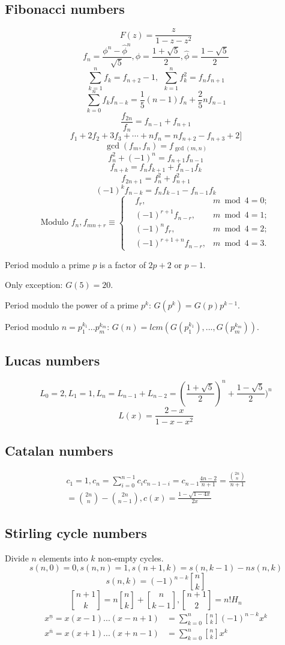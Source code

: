 	\subsection{Fibonacci numbers}
	\[ F(z) = \frac{z}{1-z-z^2} \]
	\[ f_n = \frac{{\phi}^n-{\hat{\phi}}^n}{\sqrt{5}}, \phi = \frac{1+\sqrt{5}}{2},
	\hat{\phi} = \frac{1-\sqrt{5}}{2} \]
	\[ \sum_{k=1}^nf_k = f_{n+2}-1,\ \ \sum_{k=1}^nf^2_k = f_nf_{n+1} \]
	\[ \sum_{k=0}^nf_kf_{n-k} = \frac{1}{5}(n-1)f_n+\frac{2}{5}nf_{n-1} \]
	\[ \frac{f_{2n}}{f_n} = f_{n-1} + f_{n+1}\]
	\[ f_1+2f_2+3f_3+\cdots+nf_n=nf_{n+2}-f_{n+3}+2]\]
	\[ \gcd(f_m,f_n)=f_{\gcd(m,n)}\]
	\[ f^2_n + (-1)^n = f_{n+1}f_{n-1} \]
	\[ f_{n+k} = f_nf_{k+1} + f_{n-1}f_k \]
	\[ f_{2n+1} = f^2_n+f^2_{n+1} \]
	\[ (-1)^kf_{n-k} = f_{n}f_{k-1} - f_{n-1}f_{k} \]
	\[ \text{Modulo }f_n, f_{mn+r} \equiv \left\{
	\begin{aligned}
	&f_r,& m \bmod 4 = 0; \\
	&(-1)^{r+1}f_{n-r},& m \bmod 4 = 1; \\
	&(-1)^nf_r,& m \bmod 4 = 2; \\
	&(-1)^{r+1+n}f_{n-r},& m \bmod 4 = 3.
	\end{aligned}
	\right.
	\]

	Period modulo a prime $p$ is a factor of $2p+2$ or $p-1$.

	Only exception: $G(5)=20$.

	Period modulo the power of a prime $p^k$: $G(p^k)=G(p)p^{k-1}$.

	Period modulo $n=p_1^{k_1}...p_m^{k_m}$: $G(n)=lcm(G(p_1^{k_1}),...,G(p_m^{k_m}))$.

	\subsection{Lucas numbers}
	\[ L_0=2,L_1=1,L_n=L_{n-1}+L_{n-2}=(\frac{1+\sqrt{5}}{2})^n+\frac{1-\sqrt{5}}{2})^n \]
	\[ L(x)=\frac{2-x}{1-x-x^2} \]
	\subsection{Catalan numbers}
	\begin{align*}
	c_1=1,c_n=\sum_{i=0}^{n-1}c_ic_{n-1-i}=c_{n-1}\frac{4n-2}{n+1}=\frac{\binom{2n}{n}}{n+1}\\
	=\binom{2n}{n}-\binom{2n}{n-1}, c(x)=\frac{1-\sqrt{1-4x}}{2x}
	\end{align*}
	\subsection{Stirling cycle numbers}
	Divide $n$ elements into $k$ non-empty cycles.
	\[s(n,0)=0,s(n,n)=1,s(n+1,k)=s(n,k-1)-ns(n,k)\]
	\[s(n,k)=(-1)^{n-k}{n \brack k}\]
	\[{n+1 \brack k} = n{n \brack k} + {n \brack k-1},{n+1 \brack 2} = n!H_n\]
	\begin{align*}
	x^{\underline{n}} = x(x-1)...(x-n+1) &= \sum_{k=0}^n{ {n \brack k}(-1)^{n-k}x^k }\\
	x^{\overline{n}} = x(x+1)...(x+n-1) &= \sum_{k=0}^n{ {n \brack k}x^k }\\
	\end{align*}

